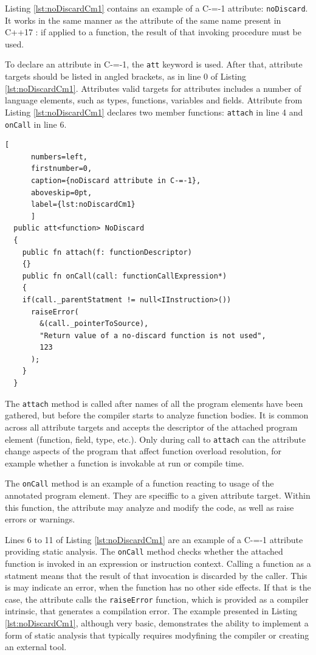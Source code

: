 Listing \ref{lst:noDiscardCm1} contains an example of a C-=-1 attribute: \lstinline{noDiscard}.
It works in the same manner as the attribute of the same name present in C++17 \cite{ISO:cpp17}: if applied to a function, the result of that invoking procedure must be used.

To declare an attribute in C-=-1, the \lstinline{att} keyword is used.
After that, attribute targets should be listed in angled brackets, as in line 0 of Listing \ref{lst:noDiscardCm1}.
Attributes valid targets for attributes includes a number of language elements, such as types, functions, variables and fields. Attribute from Listing \ref{lst:noDiscardCm1} declares two member functions: \lstinline{attach} in line 4 and \lstinline{onCall} in line 6.

\begin{minipage}{\linewidth}

	\begin{lstlisting}[
	  numbers=left,
	  firstnumber=0,
	  caption={noDiscard attribute in C-=-1},
	  aboveskip=0pt,
	  label={lst:noDiscardCm1}
	  ]
  public att<function> NoDiscard
  {
	public fn attach(f: functionDescriptor)
	{}
	public fn onCall(call: functionCallExpression*)
	{
	if(call._parentStatment != null<IInstruction>())
	  raiseError(
		&(call._pointerToSource),
		"Return value of a no-discard function is not used",
		123
	  );
	}
  }
  \end{lstlisting}
\end{minipage}

The \lstinline{attach} method is called after names of all the program elements have been gathered, but before the compiler starts to analyze function bodies.
It is common across all attribute targets and accepts the descriptor of the attached program element (function, field, type, etc.).
Only during call to \lstinline{attach} can the attribute change aspects of the program that affect function overload resolution, for example
whether a function is invokable at run or compile time.

The \lstinline{onCall} method is an example of a function reacting to usage of the annotated program element.
They are speciffic to a given attribute target.
Within this function, the attribute may analyze and modify the code, as well as raise errors or warnings.

Lines 6 to 11 of Listing \ref{lst:noDiscardCm1} are an example of a C-=-1 attribute providing static analysis.
The \lstinline{onCall} method checks whether the attached function is invoked in an expression or instruction context.
Calling a function as a statment means that the result of that invocation is discarded by the caller.
This is may indicate an error, when the function has no other side effects.
If that is the case, the attribute calls the \lstinline{raiseError} function, which is provided as a compiler intrinsic, that generates a compilation error.
The example presented in Listing \ref{lst:noDiscardCm1}, although very basic, demonstrates the ability to implement a form of static analysis that typically requires modyfining the compiler or creating an external tool.

